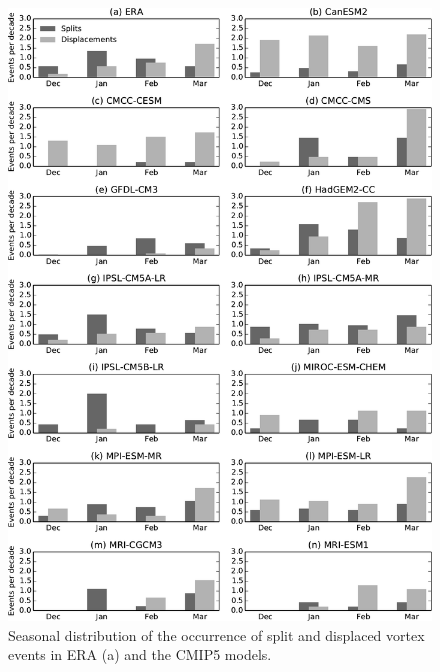 \begin{figure}
 \centering
 \noindent\includegraphics[width=\textwidth]{figures/chapter-models/events_seasonal.pdf}
 \caption[Seasonal distribution of splits and displacements in the CMIP5
 models]{Seasonal distribution of the occurrence of split and displaced vortex
   events in ERA (a) and the CMIP5 models.}
 \label{Fig2}
\end{figure}

